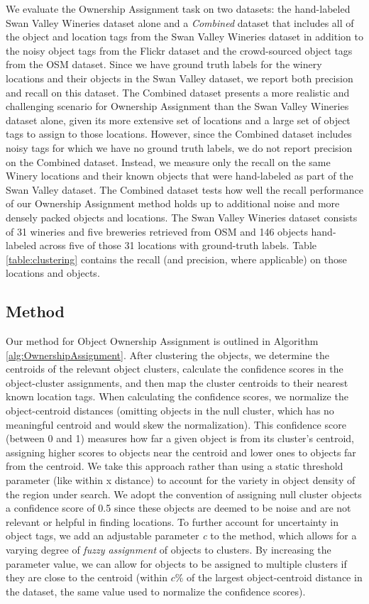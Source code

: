 We evaluate the Ownership Assignment task on two datasets: the hand-labeled Swan Valley Wineries dataset alone and a \textit{Combined} dataset that includes all of the object and location tags from the Swan Valley Wineries dataset in addition to the noisy object tags from the Flickr dataset and the crowd-sourced object tags from the OSM dataset.
Since we have ground truth labels for the winery locations and their objects in the Swan Valley dataset, we report both precision and recall on this dataset.
The Combined dataset presents a more realistic and challenging scenario for Ownership Assignment than the Swan Valley Wineries dataset alone, given its more extensive set of locations and a large set of object tags to assign to those locations. However, since the Combined dataset includes noisy tags for which we have no ground truth labels, we do not report precision on the Combined dataset. Instead, we measure only the recall on the same Winery locations and their known objects that were hand-labeled as part of the Swan Valley dataset. The Combined dataset tests how well the recall performance of our Ownership Assignment method holds up to additional noise and more densely packed objects and locations.
The Swan Valley Wineries dataset consists of 31 wineries and five breweries retrieved from OSM and 146 objects hand-labeled across five of those 31 locations with ground-truth labels. Table \ref{table:clustering} contains the recall (and precision, where applicable) on those locations and objects.

\subsection{Method}

Our method for Object Ownership Assignment is outlined in Algorithm \ref{alg:OwnershipAssignment}. 
After clustering the objects, we determine the centroids of the relevant object clusters, calculate the confidence scores in the object-cluster assignments, and then map the cluster centroids to their nearest known location tags. 
When calculating the confidence scores, we normalize the object-centroid distances (omitting objects in the null cluster, which has no meaningful centroid and would skew the normalization). 
This confidence score (between 0 and 1) measures how far a given object is from its cluster's centroid, assigning higher scores to objects near the centroid and lower ones to objects far from the centroid. 
We take this approach rather than using a static threshold parameter (like within x distance) to account for the variety in object density of the region under search. 
We adopt the convention of assigning null cluster objects a confidence score of 0.5 since these objects are deemed to be noise and are not relevant or helpful in finding locations.
To further account for uncertainty in object tags, we add an adjustable parameter \textit{c} to the method, which allows for a varying degree of \textit{fuzzy assignment} of objects to clusters. 
By increasing the parameter value, we can allow for objects to be assigned to multiple clusters if they are close to the centroid (within \textit{$c\%$} of the largest object-centroid distance in the dataset, the same value used to normalize the confidence scores). %

